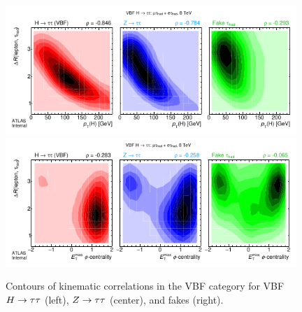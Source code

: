 \begin{figure}[tp]
  \centering
  \includegraphics[width=0.98\textwidth]{figures/kinematiccorrelations/H_pt-vs-taulep_dR}
  \includegraphics[width=0.98\textwidth]{figures/kinematiccorrelations/met_phi_cent-vs-taulep_dR}
  \caption{Contours of kinematic correlations in the VBF category for VBF $H\rightarrow\tau\tau$ (left), $Z\rightarrow\tau\tau$ (center), and fakes (right).}
  \label{fig:strategy-kinematic-correlations-2}
\end{figure}

\clearpage

